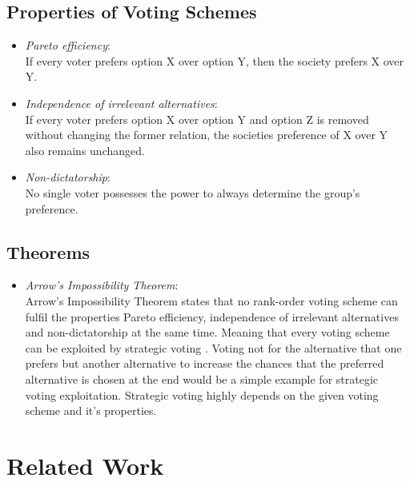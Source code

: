 \documentclass[conference]{IEEEtran}
\begin{document}
\subsection{Properties of Voting Schemes}
\begin{itemize}
    \item \textit{Pareto efficiency}:\\
    If every voter prefers option X over option Y, then the society prefers X over Y.
    \item \textit{Independence of irrelevant alternatives}:\\
    If every voter prefers option X over option Y and option Z is removed without changing the former relation, the societies preference of X over Y also remains unchanged.
    \item \textit{Non-dictatorship}:\\
    No single voter possesses the power to always determine the group's preference.
\end{itemize}

\subsection{Theorems}
\begin{itemize}
    \item \textit{Arrow's Impossibility Theorem}\cite{arrow2012social}:\\
    Arrow's Impossibility Theorem states that no rank-order voting scheme can fulfil the properties Pareto efficiency, independence of irrelevant alternatives and non-dictatorship at the same time.
    Meaning that every voting scheme can be exploited by strategic voting \cite{pitt2006voting}. Voting not for the alternative that one prefers but another alternative to increase the chances that the preferred alternative is chosen at the end would be a simple example for strategic voting exploitation. Strategic voting highly depends on the given voting scheme and it's properties.
\end{itemize}


\section{Related Work}\label{3RelatedWork}
\end{document}
